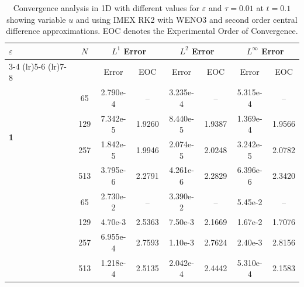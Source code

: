 \documentclass[final,11pt]{siamart251216}
\numberwithin{equation}{section}
\theoremstyle{definition}
\theoremstyle{remark}
\begin{document}
\begin{table}[htbp]
    \centering
    \small
    \begin{tabular}{@{} l c cc cc cc @{}}
        \toprule
        \multirow{2}{*}{\textbf{$\varepsilon$}} & \multirow{2}{*}{$N$} & \multicolumn{2}{c}{\textbf{$L^1$ Error}} & \multicolumn{2}{c}{\textbf{$L^2$ Error}} & \multicolumn{2}{c}{\textbf{$L^\infty$ Error}} \\
        \cmidrule(lr){3-4} \cmidrule(lr){5-6} \cmidrule(lr){7-8}
        & & Error & EOC & Error & EOC & Error & EOC \\
        \midrule
        \multirow{4}{*}{\textbf{1}} 
		& 65  & 2.790e-4 & -- & 3.235e-4 & -- & 5.315e-4 & -- \\
       & 129  & 7.342e-5 & 1.9260 & 8.440e-5 & 1.9387 & 1.369e-4 & 1.9566 \\
        & 257  & 1.842e-5 & 1.9946 & 2.074e-5 & 2.0248 & 3.242e-5 & 2.0782 \\
        & 513  & 3.795e-6 & 2.2791 & 4.261e-6 & 2.2829 & 6.396e-6 & 2.3420 \\
        
        \addlinespace[0.3cm]
        \multirow{4}{*}{\textbf{0.01}} 
		& 65  & 2.730e-2 & -- & 3.390e-2 & -- & 5.45e-2 & -- \\
       & 129  & 4.70e-3 & 2.5363 & 7.50e-3 & 2.1669 & 1.67e-2 & 1.7076 \\
        & 257  & 6.955e-4 & 2.7593 & 1.10e-3 & 2.7624 & 2.40e-3 & 2.8156 \\
        & 513  & 1.218e-4 & 2.5135 & 2.042e-4 & 2.4442 & 5.310e-4 & 2.1583 \\
        \bottomrule
    \end{tabular}
    \caption{Convergence analysis in 1D with different values for $\varepsilon$ and $\tau = 0.01$ at $t = 0.1$ showing variable $u$ and using IMEX RK2 with WENO3 and second order central difference approximations. EOC denotes the Experimental Order of Convergence.}
    \label{tab:convergence_1Dutau0dot01}
\end{table}
\end{document}
